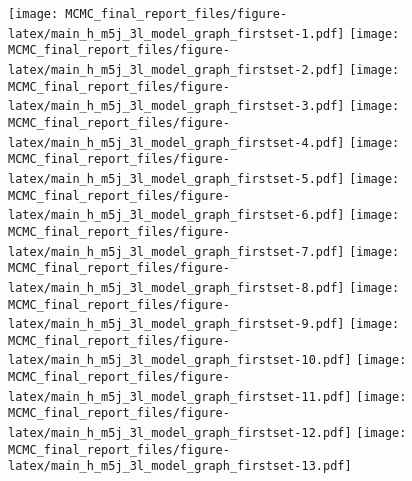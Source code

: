 \documentclass[]{article}
\begin{document}
\texttt{[image: MCMC\_final\_report\_files/figure-latex/main\_h\_m5j\_3l\_model\_graph\_firstset-1.pdf]}
\texttt{[image: MCMC\_final\_report\_files/figure-latex/main\_h\_m5j\_3l\_model\_graph\_firstset-2.pdf]}
\texttt{[image: MCMC\_final\_report\_files/figure-latex/main\_h\_m5j\_3l\_model\_graph\_firstset-3.pdf]}
\texttt{[image: MCMC\_final\_report\_files/figure-latex/main\_h\_m5j\_3l\_model\_graph\_firstset-4.pdf]}
\texttt{[image: MCMC\_final\_report\_files/figure-latex/main\_h\_m5j\_3l\_model\_graph\_firstset-5.pdf]}
\texttt{[image: MCMC\_final\_report\_files/figure-latex/main\_h\_m5j\_3l\_model\_graph\_firstset-6.pdf]}
\texttt{[image: MCMC\_final\_report\_files/figure-latex/main\_h\_m5j\_3l\_model\_graph\_firstset-7.pdf]}
\texttt{[image: MCMC\_final\_report\_files/figure-latex/main\_h\_m5j\_3l\_model\_graph\_firstset-8.pdf]}
\texttt{[image: MCMC\_final\_report\_files/figure-latex/main\_h\_m5j\_3l\_model\_graph\_firstset-9.pdf]}
\texttt{[image: MCMC\_final\_report\_files/figure-latex/main\_h\_m5j\_3l\_model\_graph\_firstset-10.pdf]}
\texttt{[image: MCMC\_final\_report\_files/figure-latex/main\_h\_m5j\_3l\_model\_graph\_firstset-11.pdf]}
\texttt{[image: MCMC\_final\_report\_files/figure-latex/main\_h\_m5j\_3l\_model\_graph\_firstset-12.pdf]}
\texttt{[image: MCMC\_final\_report\_files/figure-latex/main\_h\_m5j\_3l\_model\_graph\_firstset-13.pdf]}
\end{document}
